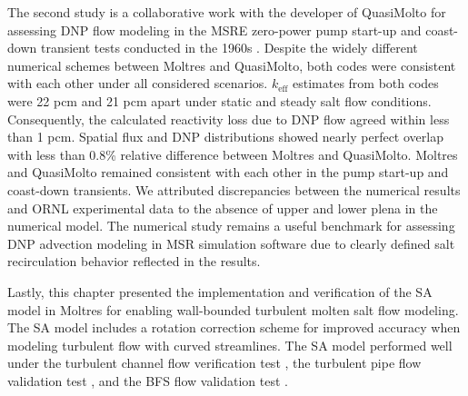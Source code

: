 The second study is a collaborative work with the developer of QuasiMolto for assessing \gls{DNP}
flow modeling in the \gls{MSRE} zero-power pump start-up and coast-down transient tests conducted
in the 1960s \cite{prince_zero-power_1968}. Despite the widely different numerical schemes between
Moltres and QuasiMolto, both codes were consistent with each other under all considered scenarios.
$k_\text{eff}$ estimates from both codes were 22 pcm and 21 pcm apart under static and steady salt
flow conditions. Consequently, the calculated reactivity loss due to \gls{DNP} flow agreed within
less than 1 pcm. Spatial flux and \gls{DNP} distributions showed nearly perfect overlap with less
than 0.8\% relative difference between Moltres and QuasiMolto. Moltres and QuasiMolto remained
consistent with each other in the pump start-up and coast-down transients. We attributed
discrepancies between the numerical results and \gls{ORNL} experimental data to the absence of
upper and lower plena in the numerical model. The numerical study remains a useful benchmark for
assessing \gls{DNP} advection modeling in \gls{MSR} simulation software due to clearly defined
salt recirculation behavior reflected in the results.

Lastly, this chapter presented the implementation and verification of the \gls{SA} model
\cite{spalart_one-equation_1994} in Moltres for enabling wall-bounded turbulent molten salt flow
modeling. The \gls{SA} model includes a rotation correction scheme
\cite{aupoix_extensions_2003, dacles-mariani_numericalexperimental_1995} for improved accuracy when
modeling turbulent flow with curved streamlines. The \gls{SA} model performed well under the
turbulent channel flow verification test \cite{moser_direct_1999}, the turbulent pipe flow
validation test \cite{laufer_structure_1954}, and the \gls{BFS} flow validation test
\cite{driver_features_1985}.
